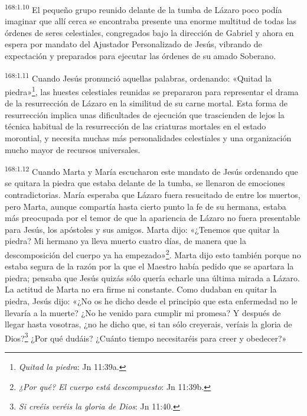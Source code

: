 \par
\textsuperscript{168:1.10} El pequeño grupo reunido delante de la tumba de Lázaro poco podía imaginar que allí cerca se encontraba presente una enorme multitud de todas las órdenes de seres celestiales, congregados bajo la dirección de Gabriel y ahora en espera por mandato del Ajustador Personalizado de Jesús, vibrando de expectación y preparados para ejecutar las órdenes de su amado Soberano.

\par
\textsuperscript{168:1.11} Cuando Jesús pronunció aquellas palabras, ordenando: «Quitad la piedra»\footnote{\textit{Quitad la piedra}: Jn 11:39a.}, las huestes celestiales reunidas se prepararon para representar el drama de la resurrección de Lázaro en la similitud de su carne mortal. Esta forma de resurrección implica unas dificultades de ejecución que trascienden de lejos la técnica habitual de la resurrección de las criaturas mortales en el estado morontial, y necesita muchas más personalidades celestiales y una organización mucho mayor de recursos universales.

\par
\textsuperscript{168:1.12} Cuando Marta y María escucharon este mandato de Jesús ordenando que se quitara la piedra que estaba delante de la tumba, se llenaron de emociones contradictorias. María esperaba que Lázaro fuera resucitado de entre los muertos, pero Marta, aunque compartía hasta cierto punto la fe de su hermana, estaba más preocupada por el temor de que la apariencia de Lázaro no fuera presentable para Jesús, los apóstoles y sus amigos. Marta dijo: «¿Tenemos que quitar la piedra? Mi hermano ya lleva muerto cuatro días, de manera que la descomposición del cuerpo ya ha empezado»\footnote{\textit{¿Por qué? El cuerpo está descompuesto}: Jn 11:39b.}. Marta dijo esto también porque no estaba segura de la razón por la que el Maestro había pedido que se apartara la piedra; pensaba que Jesús quizás sólo quería echarle una última mirada a Lázaro. La actitud de Marta no era firme ni constante. Como dudaban en quitar la piedra, Jesús dijo: «¿No os he dicho desde el principio que esta enfermedad no le llevaría a la muerte? ¿No he venido para cumplir mi promesa? Y después de llegar hasta vosotras, ¿no he dicho que, si tan sólo creyerais, veríais la gloria de Dios?\footnote{\textit{Si creéis veréis la gloria de Dios}: Jn 11:40.} ¿Por qué dudáis? ¿Cuánto tiempo necesitaréis para creer y obedecer?»


